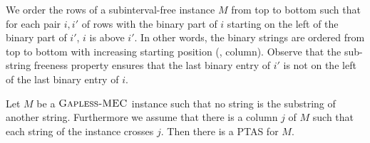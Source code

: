 We order the rows of a subinterval-free instance $M$ from top to bottom such that for each pair $i,i'$ of rows with the binary part of $i$ starting on the left of the binary part of $i'$, $i$ is above $i'$.
In other words, the binary strings are ordered from top to bottom with increasing starting position (\ie, column).
Observe that the sub-string freeness property ensures that the last binary entry of $i'$ is not on the left of the last binary entry of $i$.

\begin{lemma}\label{lem:second_instance_setting}
    Let $M$ be a $\textsc{Gapless-MEC}$ instance such that no string is the substring of another string.
    Furthermore we assume that there is a column $j$ of $M$ such that each string of the instance crosses $j$.
    Then there is a PTAS for $M$.
\end{lemma}

